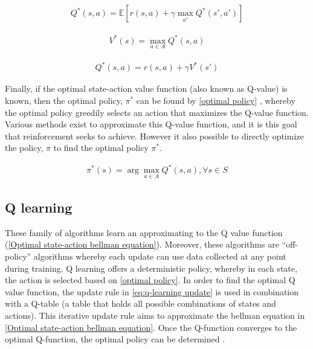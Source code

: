 \begin{equation}
	\begin{aligned}
		Q^*(s,a) =\mathbb{E} \left[r(s,a) + \gamma \max_{a'}Q^*(s',a') \right]
	\end{aligned}
	\label{Optimal state-action bellman equation}
\end{equation}

\begin{equation}
	\begin{aligned}
		V^*(s) = \max_{a\in A} Q^*(s, a)
	\end{aligned}
	\label{value and state-action relation}
\end{equation}

\begin{equation}
	\begin{aligned}
		Q^*(s,a) = r(s,a) + \gamma V^*(s') 
	\end{aligned}
	\label{eq:q-function relation to value function}
\end{equation}

Finally, if the optimal state-action value function  (also known as Q-value) is known, then the optimal policy, $\pi^*$ can be found by \autoref{optimal policy} \cite{raoOPTIMALPOLICYOPTIMAL}, whereby the optimal policy greedily selects an action that maximizes the Q-value function.
Various methods exist to approximate this Q-value function, and it is this goal that reinforcement seeks to achieve. However it also possible to directly optimize the policy, $\pi$ to find the optimal policy $\pi^*$.

\begin{equation}
	\begin{aligned}
		\pi^*(s) = \arg \max_{a \in A} Q^*(s, a), \forall s \in S
	\end{aligned}
	\label{optimal policy}
\end{equation}

\subsection{Q learning}
These family of algorithms learn an approximating to the Q value function (\autoref{Optimal state-action bellman equation}). Moreover, these algorithms are ``off-policy'' algorithms whereby each update can use data collected at any point during training. Q learning offers a deterministic policy, whereby in each state, the action is selected based on \autoref{optimal policy}. In order to find the optimal Q value function, the update rule in \autoref{eq:q-learning update} is used in combination with a Q-table (a table that holds all possible combinations of states and actions). This iterative update rule aims to approximate the bellman equation in \autoref{Optimal state-action bellman equation}. Once the Q-function converges to the optimal Q-function, the optimal policy can be determined \cite{daveUnderstandingBellmanOptimality2021}.


